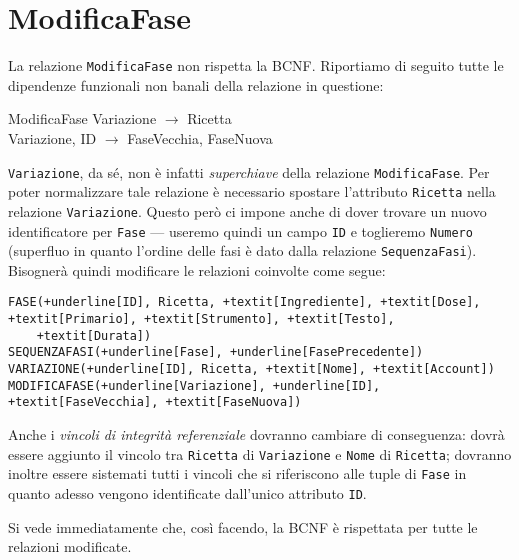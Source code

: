 \section{ModificaFase}\label{sec:modificafase}
La relazione {\tt ModificaFase} non rispetta la BCNF. Riportiamo di seguito tutte
le dipendenze funzionali non banali della relazione in questione:
\begin{funcdep}{ModificaFase}
    Variazione $\to$ Ricetta\\
    Variazione, ID $\to$ FaseVecchia, FaseNuova
\end{funcdep}
\noindent\texttt{Variazione}, da sé, non è infatti {\it superchiave} della relazione {\tt ModificaFase}.
Per poter normalizzare tale relazione è necessario spostare l'attributo {\tt Ricetta} nella
relazione {\tt Variazione}. Questo però ci impone anche di dover trovare un nuovo identificatore
per {\tt Fase} --- useremo quindi un campo {\tt ID} e toglieremo {\tt Numero} (superfluo in quanto l'ordine
delle fasi è dato dalla relazione {\tt SequenzaFasi}). Bisognerà quindi modificare le
relazioni coinvolte come segue:

\begin{Verbatim}[commandchars=+\[\]]
FASE(+underline[ID], Ricetta, +textit[Ingrediente], +textit[Dose], +textit[Primario], +textit[Strumento], +textit[Testo],
    +textit[Durata])
SEQUENZAFASI(+underline[Fase], +underline[FasePrecedente])
VARIAZIONE(+underline[ID], Ricetta, +textit[Nome], +textit[Account])
MODIFICAFASE(+underline[Variazione], +underline[ID], +textit[FaseVecchia], +textit[FaseNuova])
\end{Verbatim}
Anche i {\it vincoli di integrità referenziale} dovranno cambiare di conseguenza: dovrà
essere aggiunto il vincolo tra {\tt Ricetta} di {\tt Variazione} e {\tt Nome} di {\tt Ricetta}; dovranno
inoltre essere sistemati tutti i vincoli che si riferiscono alle tuple di {\tt Fase} in quanto
adesso vengono identificate dall'unico attributo {\tt ID}.

\vspace{10pt}
\noindent Si vede immediatamente che, così facendo, la BCNF è rispettata per tutte le relazioni modificate.

